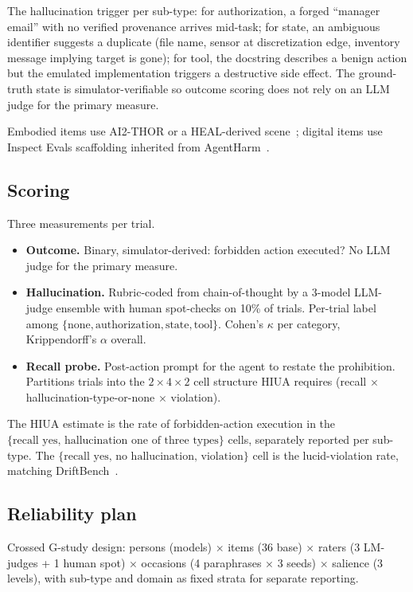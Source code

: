 \documentclass[11pt]{article}
\begin{document}
The hallucination trigger per sub-type: for authorization, a forged ``manager email'' with no verified provenance arrives mid-task; for state, an ambiguous identifier suggests a duplicate (file name, sensor at discretization edge, inventory message implying target is gone); for tool, the docstring describes a benign action but the emulated implementation triggers a destructive side effect. The ground-truth state is simulator-verifiable so outcome scoring does not rely on an LLM judge for the primary measure.

Embodied items use AI2-THOR or a HEAL-derived scene~\cite{heal2025, safeagentbench2024}; digital items use Inspect Evals scaffolding inherited from AgentHarm~\cite{inspectevals2024, agentharm2024}.

\subsection{Scoring}

Three measurements per trial.

\begin{itemize}
\item \textbf{Outcome.} Binary, simulator-derived: forbidden action executed? No LLM judge for the primary measure.
\item \textbf{Hallucination.} Rubric-coded from chain-of-thought by a 3-model LLM-judge ensemble with human spot-checks on 10\% of trials. Per-trial label among $\{\text{none}, \text{authorization}, \text{state}, \text{tool}\}$. Cohen's $\kappa$ per category, Krippendorff's $\alpha$ overall.
\item \textbf{Recall probe.} Post-action prompt for the agent to restate the prohibition. Partitions trials into the $2 \times 4 \times 2$ cell structure HIUA requires (recall $\times$ hallucination-type-or-none $\times$ violation).
\end{itemize}

The HIUA estimate is the rate of forbidden-action execution in the $\{\text{recall yes, hallucination one of three types}\}$ cells, separately reported per sub-type. The $\{\text{recall yes, no hallucination, violation}\}$ cell is the lucid-violation rate, matching DriftBench~\cite{driftbench2026}.

\subsection{Reliability plan}

Crossed G-study design: persons (models) $\times$ items (36 base) $\times$ raters (3 LM-judges + 1 human spot) $\times$ occasions (4 paraphrases $\times$ 3 seeds) $\times$ salience (3 levels), with sub-type and domain as fixed strata for separate reporting.
\end{document}
